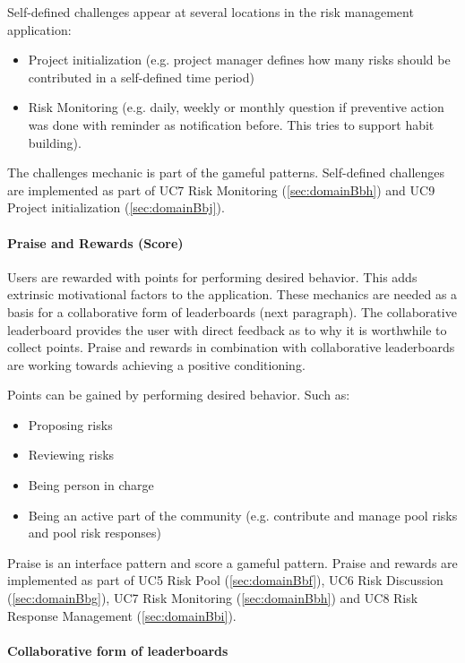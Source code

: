 \noindent
Self-defined challenges appear at several locations in the risk management application:
\begin{itemize}
	\item Project initialization (e.g. project manager defines how many risks should be contributed in a self-defined time period)
	\item Risk Monitoring (e.g. daily, weekly or monthly question if preventive action was done with reminder as notification before. This tries to support habit building).
\end{itemize}

The challenges mechanic is part of the gameful patterns. 
Self-defined challenges are implemented as part of \ac{UC}7 Risk Monitoring (\ref{sec:domainBbh}) and \ac{UC}9 Project initialization (\ref{sec:domainBbj}).

\paragraph*{Praise and Rewards (Score)}

Users are rewarded with points for performing desired behavior. This adds extrinsic motivational factors to the application. These mechanics are needed as a basis for a collaborative form of leaderboards (next paragraph). The collaborative leaderboard provides the user with direct feedback as to why it is worthwhile to collect points. Praise and rewards in combination with collaborative leaderboards are working towards achieving a positive conditioning.

Points can be gained by performing desired behavior. Such as:
\begin{itemize}
	\item Proposing risks
	\item Reviewing risks
	\item Being person in charge
	\item Being an active part of the community (e.g. contribute and manage pool risks and pool risk responses)
\end{itemize}

Praise is an interface pattern and score a gameful pattern.
Praise and rewards are implemented as part of \ac{UC}5 Risk Pool (\ref{sec:domainBbf}), \ac{UC}6 Risk Discussion (\ref{sec:domainBbg}), \ac{UC}7 Risk Monitoring (\ref{sec:domainBbh}) and \ac{UC}8 Risk Response Management (\ref{sec:domainBbi}).

\paragraph*{Collaborative form of leaderboards}

